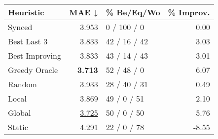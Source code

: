 \begin{tabular}{lrlr}
\toprule
\textbf{Heuristic} & \textbf{MAE ↓} & \textbf{\% Be/Eq/Wo} & \textbf{\% Improv.} \\
\midrule
            Synced &          3.953 &          0 / 100 / 0 &                0.00 \\
\midrule
       Best Last 3 &          3.833 &         42 / 16 / 42 &                3.03 \\
    Best Improving &          3.833 &         43 / 14 / 43 &                3.01 \\
\addlinespace
     Greedy Oracle &          \textbf{3.713} &          52 / 48 / 0 &                6.07 \\
            Random &          3.933 &         28 / 40 / 31 &                0.49 \\
\midrule
             Local &          3.869 &          49 / 0 / 51 &                2.10 \\
            Global &          \underline{3.725} &          50 / 0 / 50 &                5.76 \\
\midrule
            Static &          4.291 &          22 / 0 / 78 &               -8.55 \\
\bottomrule
\end{tabular}

\label{tab:ds_iid_lr05_le2_bs2_Summary}
